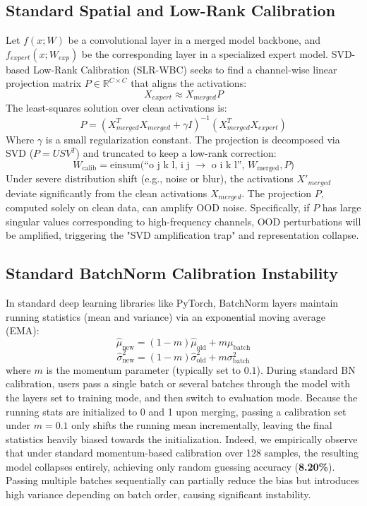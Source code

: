 \documentclass{article}
\theoremstyle{plain}
\theoremstyle{definition}
\theoremstyle{remark}
\begin{document}
\subsection{Standard Spatial and Low-Rank Calibration}
Let $f(x; W)$ be a convolutional layer in a merged model backbone, and $f_{expert}(x; W_{exp})$ be the corresponding layer in a specialized expert model. SVD-based Low-Rank Calibration (SLR-WBC) seeks to find a channel-wise linear projection matrix $P \in \mathbb{R}^{C \times C}$ that aligns the activations:
\begin{equation}
    X_{expert} \approx X_{merged} P
\end{equation}
The least-squares solution over clean activations is:
\begin{equation}
    P = (X_{merged}^T X_{merged} + \gamma I)^{-1} (X_{merged}^T X_{expert})
\end{equation}
Where $\gamma$ is a small regularization constant. The projection is decomposed via SVD ($P = U S V^T$) and truncated to keep a low-rank correction:
\begin{equation}
    W_{\text{calib}} = \text{einsum(``o j k l, i j } \rightarrow \text{ o i k l'', } W_{\text{merged}}, P\text{)}
\end{equation}
Under severe distribution shift (e.g., noise or blur), the activations $X'_{merged}$ deviate significantly from the clean activations $X_{merged}$. The projection $P$, computed solely on clean data, can amplify OOD noise. Specifically, if $P$ has large singular values corresponding to high-frequency channels, OOD perturbations will be amplified, triggering the "SVD amplification trap" and representation collapse.

\subsection{Standard BatchNorm Calibration Instability}
In standard deep learning libraries like PyTorch, BatchNorm layers maintain running statistics (mean and variance) via an exponential moving average (EMA):
\begin{equation}
    \hat{\mu}_{\text{new}} = (1 - m) \hat{\mu}_{\text{old}} + m \mu_{\text{batch}}
\end{equation}
\begin{equation}
    \hat{\sigma}^2_{\text{new}} = (1 - m) \hat{\sigma}^2_{\text{old}} + m \sigma^2_{\text{batch}}
\end{equation}
where $m$ is the momentum parameter (typically set to $0.1$). During standard BN calibration, users pass a single batch or several batches through the model with the layers set to training mode, and then switch to evaluation mode. Because the running stats are initialized to 0 and 1 upon merging, passing a calibration set under $m=0.1$ only shifts the running mean incrementally, leaving the final statistics heavily biased towards the initialization. Indeed, we empirically observe that under standard momentum-based calibration over 128 samples, the resulting model collapses entirely, achieving only random guessing accuracy (\textbf{8.20\%}). Passing multiple batches sequentially can partially reduce the bias but introduces high variance depending on batch order, causing significant instability.
\end{document}
